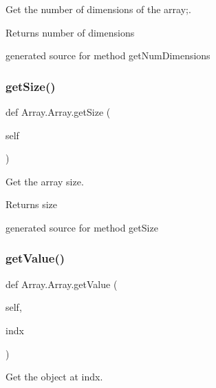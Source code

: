 Get the number of dimensions of the array;. 

\begin{DoxyReturn}{Returns}
number of dimensions\begin{DoxyVerb}generated source for method getNumDimensions \end{DoxyVerb}
 
\end{DoxyReturn}
\hypertarget{class_array_1_1_array_acc74b9873bd0ecbe67929cbd073ac3e1}{}\label{class_array_1_1_array_acc74b9873bd0ecbe67929cbd073ac3e1} 
\subsubsection{\texorpdfstring{get\+Size()}{getSize()}}
{\footnotesize\ttfamily def Array.\+Array.\+get\+Size (\begin{DoxyParamCaption}\item[{}]{self }\end{DoxyParamCaption})}



Get the array size. 

\begin{DoxyReturn}{Returns}
size\begin{DoxyVerb}generated source for method getSize \end{DoxyVerb}
 
\end{DoxyReturn}
\hypertarget{class_array_1_1_array_a6ace95175704ffe9d0c3cd0eba21f5e1}{}\label{class_array_1_1_array_a6ace95175704ffe9d0c3cd0eba21f5e1} 
\subsubsection{\texorpdfstring{get\+Value()}{getValue()}}
{\footnotesize\ttfamily def Array.\+Array.\+get\+Value (\begin{DoxyParamCaption}\item[{}]{self,  }\item[{}]{indx }\end{DoxyParamCaption})}



Get the object at \textquotesingle{}indx\textquotesingle{}. 


